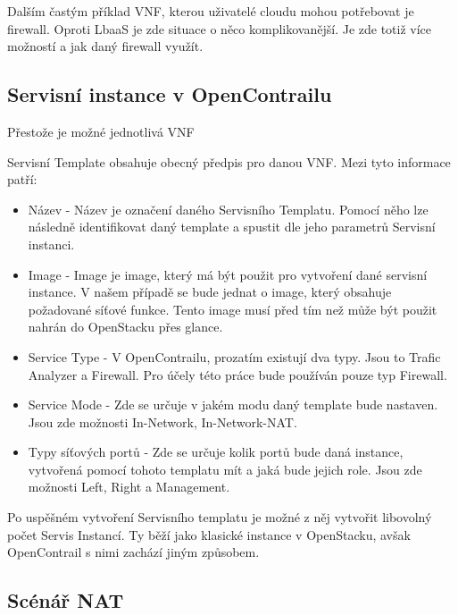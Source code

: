 Dalším častým příklad VNF, kterou uživatelé cloudu mohou potřebovat je firewall. Oproti LbaaS je zde situace o něco komplikovanější. Je zde totiž více možností a jak daný firewall využít. 

\subsection{Servisní instance v OpenContrailu}

Přestože je možné jednotlivá VNF

Servisní Template obsahuje obecný předpis pro danou VNF. Mezi tyto informace patří:

\begin{itemize}
\item Název - Název je označení daného Servisního Templatu. Pomocí něho lze následně identifikovat daný template a spustit dle jeho parametrů Servisní instanci. 
\item Image - Image je image, který má být použit pro vytvoření dané servisní instance. V našem případě se bude jednat o image, který obsahuje požadované síťové funkce. Tento image musí před tím než může být použit  nahrán do OpenStacku přes glance.
\item Service Type - V OpenContrailu, prozatím existují dva typy. Jsou to Trafic Analyzer a Firewall. Pro účely této práce bude používán pouze typ Firewall.
\item Service Mode - Zde se určuje v jakém modu daný template bude nastaven. Jsou zde možnosti In-Network, In-Network-NAT.

\item Typy síťových portů - Zde se určuje kolik portů bude daná instance, vytvořená pomocí tohoto templatu mít a jaká bude jejich role. Jsou zde možnosti Left, Right a Management. 

\end{itemize}

Po uspěšném vytvoření Servisního templatu je možné z něj vytvořit libovolný počet Servis Instancí. Ty běží jako klasické instance v OpenStacku, avšak OpenContrail s nimi zachází jiným způsobem. 

\subsection{Scénář NAT}


